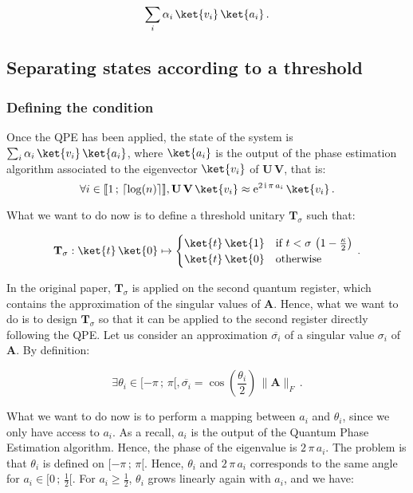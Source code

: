 \documentclass[11pt, a4paper]{article}
\begin{document}
            \[\sum_i\alpha_i\,\ket{v_i}\,\ket{a_i}\,.\]
        \subsection{Separating states according to a threshold}
            \label{subsec:Threshold}
            \subsubsection{Defining the condition}
                Once the QPE has been applied, the state of the system is \(\sum_i\alpha_i\,\ket{v_i}\,\ket{a_i}\), where \(\ket{a_i}\) is the output of the phase estimation algorithm associated to the eigenvector \(\ket{v_i}\) of \(\mathbf{U}\,\mathbf{V}\), that is:
                \[\forall i\in\llbracket1\,;\,\lceil\log(n)\rceil\rrbracket,\mathbf{U}\,\mathbf{V}\,\ket{v_i}\approx\mathrm{e}^{2\,\mathrm{i}\,\pi\,a_i}\,\ket{v_i}\,.\]
                
                What we want to do now is to define a threshold unitary \(\mathbf{T}_\sigma\) such that:
                
                \[\mathbf{T}_\sigma:\ket{t}\,\ket{0}\mapsto\begin{cases}\ket{t}\,\ket{1} &\text{if } t < \sigma\,\left(1-\frac\kappa2\right)\\\ket{t}\,\ket{0}&\text{otherwise}\end{cases}\,.\]
                
                In the original paper, \(\mathbf{T}_\sigma\) is applied on the second quantum register, which contains the approximation of the singular values of \(\mathbf{A}\). Hence, what we want to do is to design \(\mathbf{T}_\sigma\) so that it can be applied to the second register directly following the QPE. Let us consider an approximation \(\overline{\sigma_i}\) of a singular value \(\sigma_i\) of \(\mathbf{A}\). By definition:
                
                \[\exists\theta_i\in[-\pi\,;\,\pi[,\overline{\sigma_i}=\cos\left(\frac{\theta_i}{2}\right)\,\|\mathbf{A}\|_F\,.\]
                
                What we want to do now is to perform a mapping between \(a_i\) and \(\theta_i\), since we only have access to \(a_i\). As a recall, \(a_i\) is the output of the Quantum Phase Estimation algorithm. Hence, the phase of the eigenvalue is \(2\,\pi\,a_i\). The problem is that \(\theta_i\) is defined on \([-\pi\,;\,\pi[\). Hence, \(\theta_i\) and \(2\,\pi\,a_i\) corresponds to the same angle for \(a_i\in[0\,;\,\frac12[\). For \(a_i\geqslant\frac12\), \(\theta_i\) grows linearly again with \(a_i\), and we have:
                
\end{document}
